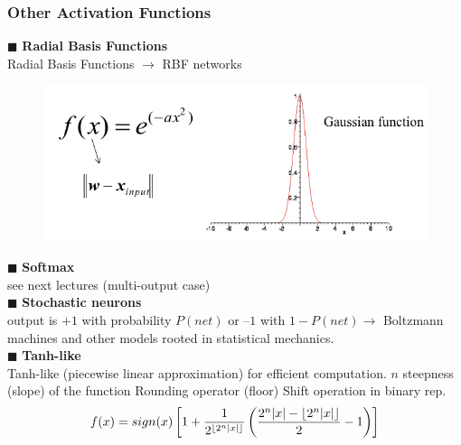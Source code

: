 \documentclass[../main.tex]{subfiles}
\begin{document}
\subsubsection{Other Activation Functions}
\noindent$\blacksquare$ \textbf{Radial Basis Functions}\\
Radial Basis Functions $\rightarrow$ RBF networks
\begin{figure}[H]
    \centering
    \includegraphics[scale = 0.4]{lectures/4_neural_networks/4_Radial_Basis_Functions.png}
\end{figure}

\noindent$\blacksquare$ \textbf{Softmax}\\
see next lectures (multi-output case)\\

\noindent$\blacksquare$ \textbf{Stochastic neurons}\\
output is $+1$ with probability $P(net)$ or $–1$ with $1-P(net)\rightarrow$ Boltzmann machines and other models rooted in statistical mechanics.\\

\noindent$\blacksquare$ \textbf{Tanh-like}\\
Tanh-like (piecewise linear approximation) for efficient computation. $n$ steepness (slope) of the function Rounding operator (floor)
Shift operation in binary rep.
$$ f(x) = sign(x)\left[ 1 + \frac{1}{2^{\lfloor 2^n \lvert x\rvert \rfloor}} \left( \frac{2^n\lvert x\rvert- \lfloor 2^n \lvert x\rvert\rfloor}{2}-1 \right) \right]$$
\end{document}
